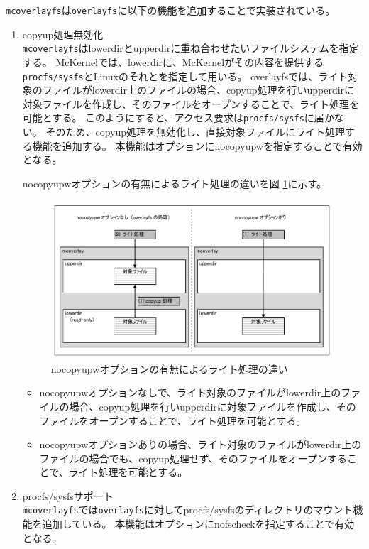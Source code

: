 \documentclass[twoside,11pt,fleqn]{book}
\begin{document}
\texttt{mcoverlayfs}は\texttt{overlayfs}に以下の機能を追加することで実装されている。
\begin{enumerate}
\item copyup処理無効化\\
\texttt{mcoverlayfs}はlowerdirとupperdirに重ね合わせたいファイルシステムを指定する。
McKernelでは、lowerdirに、McKernelがその内容を提供する\texttt{procfs/sysfs}とLinuxのそれとを指定して用いる。
overlayfsでは、ライト対象のファイルがlowerdir上のファイルの場合、copyup処理を行いupperdirに対象ファイルを作成し、そのファイルをオープンすることで、ライト処理を可能とする。
このようにすると、アクセス要求は\texttt{procfs/sysfs}に届かない。
そのため、copyup処理を無効化し、直接対象ファイルにライト処理する機能を追加する。
本機能はオプションにnocopyupwを指定することで有効となる。

nocopyupwオプションの有無によるライト処理の違いを図 \ref{figure:chap05_fig001}に示す。
\begin{figure}[ht]
  \includegraphics[scale=0.85]{figs/chap05_fig001.pdf}
  \caption{nocopyupwオプションの有無によるライト処理の違い}
  \label{figure:chap05_fig001}
\end{figure}

\begin{itemize}
  \item nocopyupwオプションなしで、ライト対象のファイルがlowerdir上のファイルの場合、copyup処理を行いupperdirに対象ファイルを作成し、そのファイルをオープンすることで、ライト処理を可能とする。
  \item nocopyupwオプションありの場合、ライト対象のファイルがlowerdir上のファイルの場合でも、copyup処理せず、そのファイルをオープンすることで、ライト処理を可能とする。
\end{itemize}

\item procfs/sysfsサポート\\
\texttt{mcoverlayfs}では\texttt{overlayfs}に対してprocfs/sysfsのディレクトリのマウント機能を追加している。
本機能はオプションにnofscheckを指定することで有効となる。
\end{enumerate}
\end{document}
